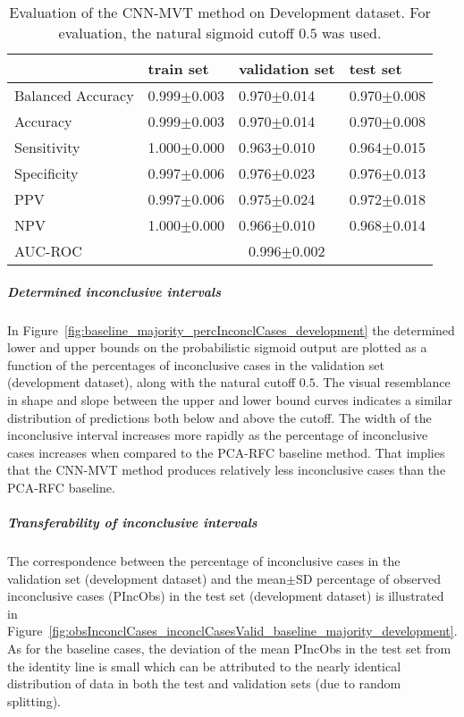 \begin{table}[ht]
  \caption{Evaluation of the CNN-MVT method on Development dataset. 
  For evaluation, the natural sigmoid cutoff $0.5$ was used.}
  \centering
  \begin{tabular}{llll}
      \hline
                        & train set         & validation set      & test set             \\
      \hline
      Balanced Accuracy & 0.999$\pm$0.003   &  0.970$\pm$0.014    &  0.970$\pm$0.008   \\
      Accuracy          & 0.999$\pm$0.003    &   0.970$\pm$0.014   &  0.970$\pm$0.008   \\
      Sensitivity       &  1.000$\pm$0.000   &   0.963$\pm$0.010   &  0.964$\pm$0.015  \\
      Specificity       &   0.997$\pm$0.006   &   0.976$\pm$0.023  &   0.976$\pm$0.013  \\
      PPV               &  0.997$\pm$0.006   &   0.975$\pm$0.024   &  0.972$\pm$0.018 \\
      NPV               &  1.000$\pm$0.000    &   0.966$\pm$0.010   & 0.968$\pm$0.014  \\
      \hline
      AUC-ROC          &  \multicolumn{3}{c}{0.996$\pm$0.002}  \\
      \hline
  \end{tabular}
 \label{t1:cnn_mvt_perf_eval_table}
\end{table}

\subparagraph{Determined inconclusive intervals}

In Figure~\ref{fig:baseline_majority_percInconclCases_development} the determined lower and upper bounds on the 
probabilistic sigmoid output are plotted as a function of the percentages of inconclusive cases 
in the validation set (development dataset), along with the natural cutoff $0.5$.
The visual resemblance in shape and slope between the upper and lower bound curves 
indicates a similar distribution of predictions both below and above the cutoff.
The width of the inconclusive interval increases more rapidly as the percentage of inconclusive cases increases 
when compared to the PCA-RFC baseline method.
That implies that the CNN-MVT method produces relatively less inconclusive cases than the PCA-RFC baseline.


\subparagraph{Transferability of inconclusive intervals}

The correspondence between the percentage of inconclusive cases in the validation set (development dataset) and 
the mean$\pm$SD percentage of observed inconclusive cases (PIncObs) in the test set (development dataset) 
is illustrated in Figure~\ref{fig:obsInconclCases_inconclCasesValid_baseline_majority_development}.
As for the baseline cases, the deviation of the mean PIncObs in the test set from the 
identity line is small which can be attributed to the nearly identical distribution of data in both the test and validation sets 
(due to random splitting).


